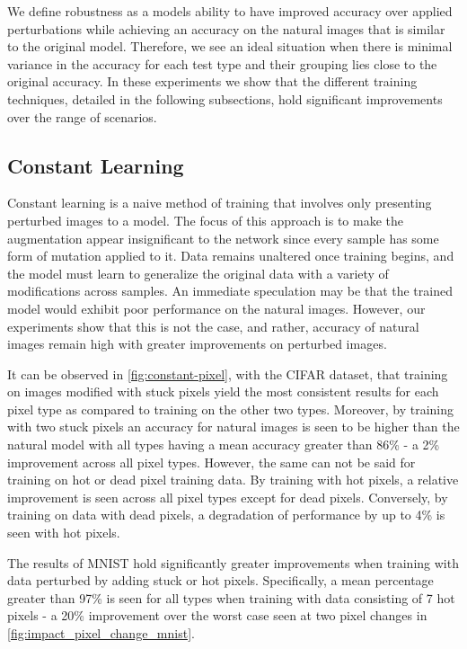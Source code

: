 \documentclass[conference]{IEEEtran}
\begin{document}
We define robustness as a models ability to have improved accuracy over applied perturbations while achieving an accuracy on the natural images that is similar to the original model. Therefore, we see an ideal situation when there is minimal variance in the accuracy for each test type and their grouping lies close to the original accuracy. In these experiments we show that the different training techniques, detailed in the following subsections, hold significant improvements over the range of scenarios.

\subsection{Constant Learning}

Constant learning is a naive method of training that involves only presenting perturbed images to a model. The focus of this approach is to make the augmentation appear insignificant to the network since every sample has some form of mutation applied to it. Data remains unaltered once training begins, and the model must learn to generalize the original data with a variety of modifications across samples. An immediate speculation may be that the trained model would exhibit poor performance on the natural images. However, our experiments show that this is not the case, and rather, accuracy of natural images remain high with greater improvements on perturbed images.

It can be observed in \autoref{fig:constant-pixel}, with the CIFAR dataset, that training on images modified with stuck pixels yield the most consistent results for each pixel type as compared to training on the other two types. Moreover, by training with two stuck pixels an accuracy for natural images is seen to be higher than the natural model with all types having a mean accuracy greater than 86\% - a 2\% improvement across all pixel types. However, the same can not be said for training on hot or dead pixel training data. By training with hot pixels, a relative improvement is seen across all pixel types except for dead pixels. Conversely, by training on data with dead pixels, a degradation of performance by up to 4\% is seen with hot pixels. 

The results of MNIST hold significantly greater improvements when training with data perturbed by adding stuck or hot pixels. Specifically, a mean percentage greater than 97\% is seen for all types when training with data consisting of 7 hot pixels -  a 20\% improvement over the worst case seen at two pixel changes in \autoref{fig:impact_pixel_change_mnist}. 
\end{document}
